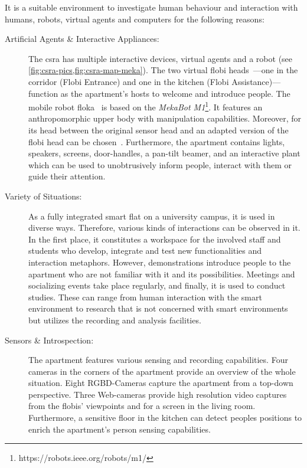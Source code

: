 It is a suitable environment to investigate human behaviour and interaction with humans, \glspl{robot}, \glspl{virtual agent} and computers for the following reasons:
\begin{description}
\item[Artificial Agents \& Interactive Appliances:] The \gls{csra} has multiple interactive \glspl{device}, \glspl{virtual agent} and a \gls{robot} (see \cref{fig:csra-pics,fig:csra-map-meka}).
The two virtual \gls{flobi} heads~\cite{Lutkebohle2010,Lier2012}---one in the corridor (\gls{Flobi Entrance}) and one in the kitchen (\gls{Flobi Assistance})---function as the \gls{apartment}'s hosts to welcome and introduce people.
The mobile \gls{robot} \gls{floka}~\cite{Meyer2017} is based on the \emph{MekaBot M1}\footnote{https://robots.ieee.org/robots/m1/}.
It features an anthropomorphic upper body with manipulation capabilities.
Moreover, for its head between the original sensor head and an adapted version of the \gls{flobi} head can be chosen~\cite{Schulz2019}.
Furthermore, the \gls{apartment} contains lights, speakers, screens, door-handles, a pan-tilt beamer, and an interactive plant which can be used to unobtrusively inform people, interact with them or guide their attention.
\item[Variety of Situations:] As a fully integrated smart flat on a university campus, it is used in diverse ways.
Therefore, various kinds of interactions can be observed in it.
In the first place, it constitutes a workspace for the involved staff and students who develop, integrate and test new functionalities and interaction metaphors.
However, demonstrations introduce people to the \gls{apartment} who are not familiar with it and its possibilities.
Meetings and socializing events take place regularly, and finally, it is used to conduct studies.
These can range from human interaction with the \gls{smart environment} to research that is not concerned with \glspl{smart environment} but utilizes the recording and analysis facilities.
\item[Sensors \& Introspection:] The \gls{apartment} features various sensing and recording capabilities.
Four cameras in the corners of the \gls{apartment} provide an overview of the whole situation.
Eight RGBD-Cameras capture the \gls{apartment} from a top-down perspective.
Three Web-cameras provide high resolution video captures from the \glspl{flobi}' viewpoints and for a screen in the living room.
Furthermore, a sensitive floor in the kitchen can detect peoples positions to enrich the \gls{apartment}'s person sensing capabilities.

\end{description}
